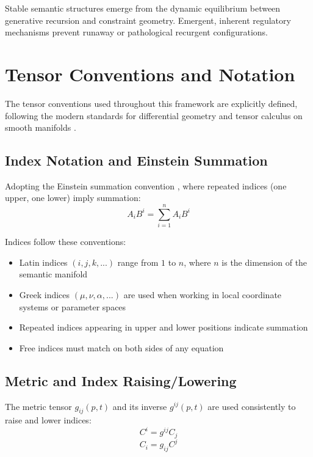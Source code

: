 Stable semantic structures emerge from the dynamic equilibrium between generative recursion and constraint geometry. Emergent, inherent regulatory mechanisms prevent runaway or pathological recurgent configurations.

\section{Tensor Conventions and Notation}

The tensor conventions used throughout this framework are explicitly defined, following the modern standards for differential geometry and tensor calculus on smooth manifolds \autocite{Lee2003}.

\subsection{Index Notation and Einstein Summation}

Adopting the Einstein summation convention \autocite{Einstein1916}, where repeated indices (one upper, one lower) imply summation:
\begin{equation}
A_i B^i = \sum_{i=1}^n A_i B^i
\end{equation}

Indices follow these conventions:
\begin{itemize}
    \item Latin indices \((i,j,k,...)\) range from \(1\) to \(n\), where \(n\) is the dimension of the semantic manifold
    \item Greek indices \((\mu,\nu,\alpha,...)\) are used when working in local coordinate systems or parameter spaces
    \item Repeated indices appearing in upper and lower positions indicate summation
    \item Free indices must match on both sides of any equation
\end{itemize}

\subsection{Metric and Index Raising/Lowering}

The metric tensor \(g_{ij}(p,t)\) and its inverse \(g^{ij}(p,t)\) are used consistently to raise and lower indices:
\begin{equation}
C^i = g^{ij} C_j
\end{equation}
\begin{equation}
C_i = g_{ij} C^j
\end{equation}

